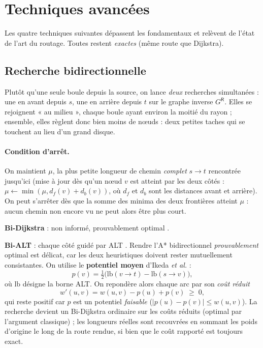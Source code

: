 \section{Techniques avancées}
\label{sec:beyond}

Les quatre techniques suivantes dépassent les fondamentaux et relèvent de l'état
de l'art du routage. Toutes restent \emph{exactes} (même route que Dijkstra).

\subsection{Recherche bidirectionnelle}
\label{sec:bidir}
Plutôt qu'une seule boule depuis la source, on lance \emph{deux} recherches
simultanées \citep{nicholson1966} : une en avant depuis $s$, une en arrière
depuis $t$ sur le graphe inverse $G^{\mathsf R}$. Elles se rejoignent « au
milieu », chaque boule ayant environ la moitié du rayon ; ensemble, elles règlent
donc bien moins de nœuds : deux petites taches qui se touchent au lieu d'un
grand disque.

\paragraph{Condition d'arrêt.} On maintient $\mu$, la plus petite longueur de
chemin \emph{complet} $s \to t$ rencontrée jusqu'ici (mise à jour dès qu'un nœud
$v$ est atteint par les deux côtés : $\mu \gets \min(\mu, d_f(v) + d_b(v))$, où
$d_f$ et $d_b$ sont les distances avant et arrière). On peut s'arrêter dès que la
somme des minima des deux frontières atteint $\mu$ : aucun chemin non encore vu ne
peut alors être plus court.

\begin{bulletlist}
  \item \textbf{Bi-Dijkstra} : non informé, prouvablement optimal
        \citep{nicholson1966}.
  \item \textbf{Bi-ALT} : chaque côté guidé par ALT \citep{pohl1971}. Rendre
        l'A* bidirectionnel \emph{prouvablement} optimal est délicat, car les deux
        heuristiques doivent rester mutuellement consistantes. On utilise le
        \textbf{potentiel moyen} d'Ikeda \emph{et al.} \citep{ikeda1994} :
        \[
          p(v) = \tfrac12\big(\text{lb}(v \to t) - \text{lb}(s \to v)\big),
        \]
        où $\text{lb}$ désigne la borne ALT. On repondère alors chaque arc par son
        \emph{coût réduit}
        \[
          w'(u,v) = w(u,v) - p(u) + p(v) \;\ge\; 0 ,
        \]
        qui reste positif car $p$ est un potentiel \emph{faisable}
        ($|p(u)-p(v)| \le w(u,v)$). La recherche devient un Bi-Dijkstra ordinaire
        sur les coûts réduits (optimal par l'argument classique) ; les longueurs
        réelles sont recouvrées en sommant les poids d'origine le long de la route
        rendue, si bien que le coût rapporté est toujours exact.
\end{bulletlist}

